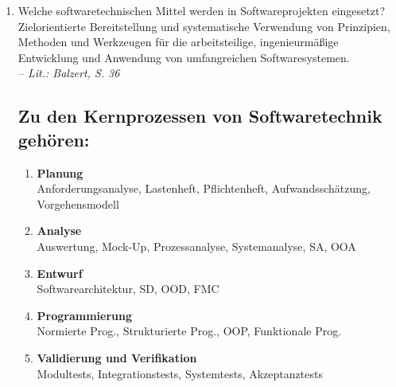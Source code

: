 \documentclass{article}
\newcommand{\gqq}[1]{\glqq{}#1\grqq{}}
\begin{document}
    \begin{enumerate}[label=\alph*.]
        \item Welche softwaretechnischen Mittel werden in Softwareprojekten eingesetzt?\\
               
            \gqq{Zielorientierte Bereitstellung und systematische Verwendung von Prinzipien, Methoden und Werkzeugen für die arbeitsteilige, ingenieurmäßige Entwicklung und Anwendung von umfangreichen Softwaresystemen.}\\
            \emph{– Lit.: Balzert, S. 36}
            \subsection*{Zu den Kernprozessen von Softwaretechnik gehören:}
            \begin{enumerate}[label=\arabic*.]
                \item \textbf{Planung}\\
                    Anforderungsanalyse, Lastenheft, Pflichtenheft, Aufwandsschätzung, Vorgehensmodell
                \item \textbf{Analyse}\\
                    Auswertung, Mock-Up, Prozessanalyse, Systemanalyse, SA, OOA
                \item \textbf{Entwurf}\\
                    Softwarearchitektur, SD, OOD, FMC
                \item \textbf{Programmierung}\\
                    Normierte Prog., Strukturierte Prog., OOP, Funktionale Prog.
                \item \textbf{Validierung und Verifikation}\\
                    Modultests, Integrationstests, Systemtests, Akzeptanztests
            \end{enumerate}

\end{enumerate}
\end{document}

